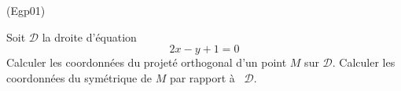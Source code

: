 \begin{tiny}(Egp01)\end{tiny}
Soit $\mathcal{D}$ la droite d'équation
\[2x-y+1=0\]
Calculer les coordonnées du projeté orthogonal d'un point $M$ sur $\mathcal{D}$. Calculer les coordonnées du symétrique de $M$ par rapport à  $\mathcal{D}$.
